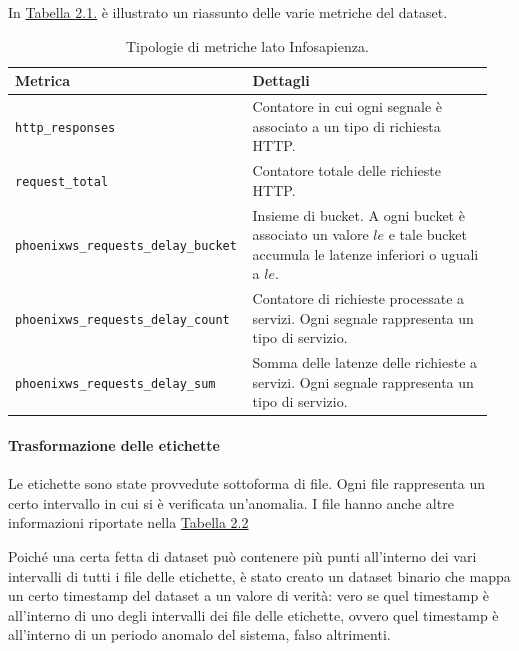 In \hyperref[tab:infosapienza-metrics]{Tabella 2.1.} è illustrato un riassunto delle varie metriche del dataset.
 \begin{table}[H]
    \centering
    \caption{Tipologie di metriche lato Infosapienza.}
    \begin{tabular}{p{0.45\linewidth}p{0.5\linewidth}}
        \toprule
        \textbf{Metrica} & \textbf{Dettagli} \\
        \toprule
        \texttt{http\_responses} & Contatore in cui ogni segnale è associato a un tipo di richiesta HTTP. \\
        \midrule
        \texttt{request\_total} & Contatore totale delle richieste HTTP. \\
        \midrule
        \texttt{phoenixws\_requests\_delay\_bucket} & Insieme di bucket. A ogni bucket è associato un valore $le$ e tale bucket accumula le latenze inferiori o uguali a $le$. \\
        \midrule
        \texttt{phoenixws\_requests\_delay\_count} & Contatore di richieste processate a servizi. Ogni segnale rappresenta un tipo di servizio. \\
        \midrule
        \texttt{phoenixws\_requests\_delay\_sum} & Somma delle latenze delle richieste a servizi. Ogni segnale rappresenta un tipo di servizio. \\
        \bottomrule
    \end{tabular}
    \label{tab:infosapienza-metrics}
\end{table}

    \paragraph{Trasformazione delle etichette}
    Le etichette sono state provvedute sottoforma di file. Ogni file rappresenta 
    un certo intervallo in cui si è verificata un'anomalia. I file hanno anche altre informazioni riportate nella 
    \hyperref[tab:info-labels]{Tabella 2.2}

    Poiché una certa fetta di dataset può contenere più punti all'interno dei vari intervalli di tutti i file delle 
    etichette, è stato creato un dataset binario che mappa un certo timestamp del dataset a un valore di verità: vero 
    se quel timestamp è all'interno di uno degli intervalli dei file delle etichette, ovvero quel timestamp è 
    all'interno di un periodo anomalo del sistema, falso altrimenti.

